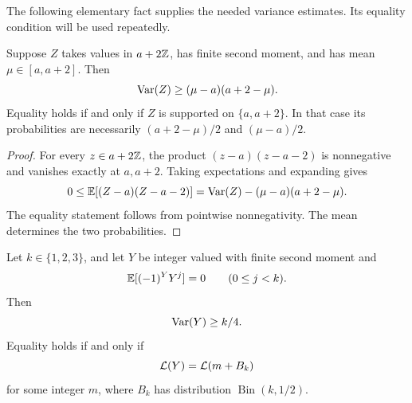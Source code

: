 The following elementary fact supplies the needed variance estimates.
Its equality condition will be used repeatedly.

\begin{lemma}
\label{codim:lattice}
Suppose \(Z\) takes values in \(a+2\mathbb Z\), has finite second moment,
and has mean \(\mu\in[a,a+2]\).  Then
\begin{equation}
\label{codim:lattice-bound}
\operatorname{Var}(Z)\ge(\mu-a)(a+2-\mu).
\end{equation}
Equality holds if and only if \(Z\) is supported on
\(\{a,a+2\}\).  In that case its probabilities are necessarily
\((a+2-\mu)/2\) and \((\mu-a)/2\).
\end{lemma}

\begin{proof}
For every \(z\in a+2\mathbb Z\), the product
\((z-a)(z-a-2)\) is nonnegative and vanishes exactly at \(a,a+2\).
Taking expectations and expanding gives
\[
0\le \mathbb E[(Z-a)(Z-a-2)]
=\operatorname{Var}(Z)-(\mu-a)(a+2-\mu).
\]
The equality statement follows from pointwise nonnegativity.
The mean determines the two probabilities.
\end{proof}

\begin{proposition}
\label{codim:moment-variance}
Let \(k\in\{1,2,3\}\), and let \(Y\) be integer valued with finite
second moment and
\begin{equation}
\label{codim:abstract-moments}
\mathbb E[(-1)^Y Y^j]=0
\qquad(0\le j<k).
\end{equation}
Then
\[
\operatorname{Var}(Y)\ge k/4.
\]
Equality holds if and only if
\[
\mathcal L(Y)=\mathcal L(m+B_k)
\]
for some integer \(m\), where \(B_k\) has distribution
\(\operatorname{Bin}(k,1/2)\).
\end{proposition}


